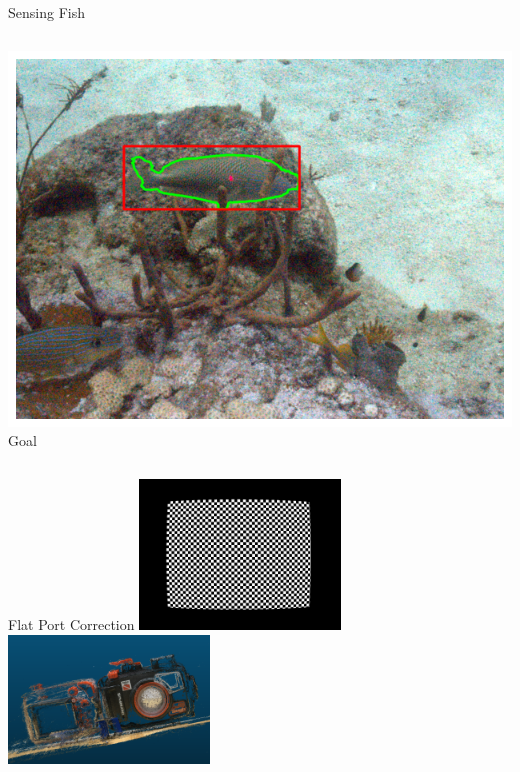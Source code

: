 \begin{frame}{Sensing Fish}
\begin{columns}
\begin{column}{0.33\textwidth}
            \includegraphics[width=\linewidth,keepaspectratio]{images/ideal.png}
            {\small Goal}
        \end{column}
    \end{columns}
\end{frame}

\begin{frame}{Flat Port Correction}
    \centering
    \includegraphics[width=0.4\textwidth,keepaspectratio]{images/remapped.jpg}
    \includegraphics[width=0.4\textwidth,keepaspectratio]{images/point_cloud_camera_enclosure.png}
\end{frame}


